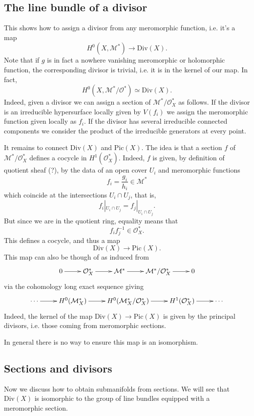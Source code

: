 \subsection{The line bundle of a divisor}
\label{subsection-line-bundle-of-divisor}

This shows how to assign a divisor from any
meromorphic function,
i.e. it's a map
$$
H^0(X,\mathcal{M}^*) \to \text{Div}(X).
$$
Note that if $g$ is in fact a nowhere
vanishing meromorphic or
holomorphic function,
the corresponding divisor is trivial,
i.e. it is in the kernel of our map.
In fact,
$$
H^0(X,\mathcal{M}^*/\mathcal{O}^*) \simeq
\text{Div}(X).
$$
Indeed, given a divisor we can assign a
section of
$\mathcal{M}^*/\mathcal{O}_X^*$ as follows.
If the divisor is an irreducible hypersurface
locally given by $V(f_i)$
we assign the meromorphic function given
locally as $f_i$.
If the divisor has several irreducible
connected components
we consider the product of the irreducible
generators
at every point.

\medskip\noindent
It remains to connect $\text{Div}(X)$ and
$\text{Pic}(X)$.
The idea is that a section $f$ of
$\mathcal{M}^*/\mathcal{O}_X^*$
defines a cocycle in $H^1(\mathcal{O}_X^*)$.
Indeed, $f$ is given, by definition of
quotient sheaf (?),
by the data of an open cover $U_i$ and
meromorphic functions
$$
f_i=\frac{g_i}{h_i} \in \mathcal{M}^*
$$
which coincide at the intersections $U_i \cap
U_j$,
that is,
$$
f_i|_{U_i\cap U_j} = f_j|_{U_i\cap U_j}.
$$
But since we are in the quotient ring,
equality means that
$$
f_i f_j^{-1} \in \mathcal{O}_X^*.
$$
This defines a cocycle, and thus a map
$$
\text{Div}(X) \to \text{Pic}(X).
$$
This map can also be though of as induced
from
$$
\xymatrix{
0\ar[r]
&\mathcal{O}^*_X\ar[r]
&\mathcal{M}^*\ar[r]
&\mathcal{M}^*/\mathcal{O}_X^*\ar[r]
&0
}
$$
via the cohomology long exact sequence giving
$$
\xymatrix{
\cdots\ar[r]
& H^0(\mathcal{M}^*_X)\ar[r]
&H^0(\mathcal{M}^*_X/\mathcal{O}^*_X)\ar[r]
&H^1(\mathcal{O}_X^*)\ar[r]
&\cdots
}
$$
Indeed, the kernel of the map $\text{Div}(X)
\to \text{Pic}(X)$
is given by the principal divisors,
i.e. those coming from meromorphic sections.

In general there is no way to ensure this map
is an isomorphism.

\subsection{Sections and divisors}
\label{subsection-sections-and-divisors}

\medskip\noindent
Now we discuss how to obtain submanifolds
from sections.
We will see that $\text{Div}(X)$
is isomorphic to the group of line bundles
equipped with a meromorphic section.


